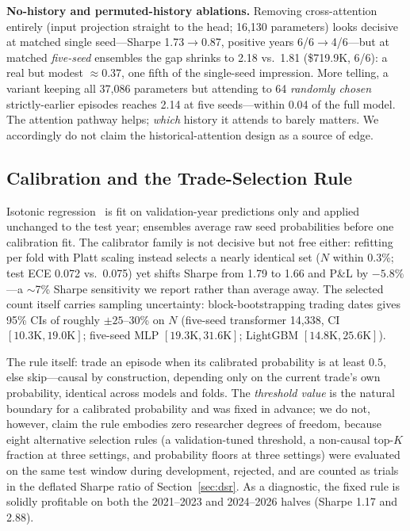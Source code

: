\documentclass[sigconf,review,anonymous]{acmart}
\begin{document}
\noindent\textbf{No-history and permuted-history ablations.}
\label{sec:ablations}
Removing cross-attention entirely (input projection straight to the head; 16{,}130 parameters) looks decisive at matched single seed---Sharpe 1.73$\to$0.87, positive years 6/6$\to$4/6---but at matched \emph{five-seed} ensembles the gap shrinks to 2.18 vs.\ 1.81 (\$719.9K, 6/6): a real but modest $\approx$0.37, one fifth of the single-seed impression. More telling, a variant keeping all 37{,}086 parameters but attending to 64 \emph{randomly chosen} strictly-earlier episodes reaches 2.14 at five seeds---within 0.04 of the full model. The attention pathway helps; \emph{which} history it attends to barely matters. We accordingly do not claim the historical-attention design as a source of edge.

\subsection{Calibration and the Trade-Selection Rule}
\label{sec:calibration}
Isotonic regression~\cite{zadrozny2002transforming} is fit on validation-year predictions only and applied unchanged to the test year; ensembles average raw seed probabilities before one calibration fit. The calibrator family is not decisive but not free either: refitting per fold with Platt scaling instead selects a nearly identical set ($N$ within 0.3\%; test ECE 0.072 vs.\ 0.075) yet shifts Sharpe from 1.79 to 1.66 and P\&L by $-5.8\%$---a $\sim$7\% Sharpe sensitivity we report rather than average away.
The selected count itself carries sampling uncertainty: block-bootstrapping trading dates gives 95\% CIs of roughly $\pm25$--30\% on $N$ (five-seed transformer 14{,}338, CI $[10.3\text{K},19.0\text{K}]$; five-seed MLP $[19.3\text{K},31.6\text{K}]$; LightGBM $[14.8\text{K},25.6\text{K}]$).

The rule itself: trade an episode when its calibrated probability is at least $0.5$, else skip---causal by construction, depending only on the current trade's own probability, identical across models and folds. The \emph{threshold value} is the natural boundary for a calibrated probability and was fixed in advance; we do not, however, claim the rule embodies zero researcher degrees of freedom, because eight alternative selection rules (a validation-tuned threshold, a non-causal top-$K$ fraction at three settings, and probability floors at three settings) were evaluated on the same test window during development, rejected, and are counted as trials in the deflated Sharpe ratio of Section~\ref{sec:dsr}. As a diagnostic, the fixed rule is solidly profitable on both the 2021--2023 and 2024--2026 halves (Sharpe 1.17 and 2.88).
\end{document}
